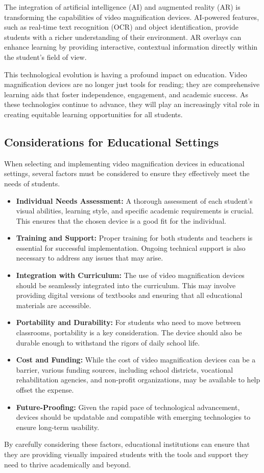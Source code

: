 The integration of artificial intelligence (AI) and augmented reality (AR) is transforming the capabilities of video magnification devices. AI-powered features, such as real-time text recognition (OCR) and object identification, provide students with a richer understanding of their environment. AR overlays can enhance learning by providing interactive, contextual information directly within the student's field of view.\supercite{aimodels2024, msseeingai, envision}

This technological evolution is having a profound impact on education. Video magnification devices are no longer just tools for reading; they are comprehensive learning aids that foster independence, engagement, and academic success. As these technologies continue to advance, they will play an increasingly vital role in creating equitable learning opportunities for all students.\supercite{StudentOutcomesResearch, Foley2017AssistiveTechnologyOutcomes}

\subsection{Considerations for Educational Settings}
When selecting and implementing video magnification devices in educational settings, several factors must be considered to ensure they effectively meet the needs of students.

\begin{itemize}
	\item \textbf{Individual Needs Assessment:} A thorough assessment of each student's visual abilities, learning style, and specific academic requirements is crucial. This ensures that the chosen device is a good fit for the individual.
	\item \textbf{Training and Support:} Proper training for both students and teachers is essential for successful implementation. Ongoing technical support is also necessary to address any issues that may arise.
	\item \textbf{Integration with Curriculum:} The use of video magnification devices should be seamlessly integrated into the curriculum. This may involve providing digital versions of textbooks and ensuring that all educational materials are accessible.
	\item \textbf{Portability and Durability:} For students who need to move between classrooms, portability is a key consideration. The device should also be durable enough to withstand the rigors of daily school life.
	\item \textbf{Cost and Funding:} While the cost of video magnification devices can be a barrier, various funding sources, including school districts, vocational rehabilitation agencies, and non-profit organizations, may be available to help offset the expense.
	\item \textbf{Future-Proofing:} Given the rapid pace of technological advancement, devices should be updatable and compatible with emerging technologies to ensure long-term usability.
\end{itemize}

By carefully considering these factors, educational institutions can ensure that they are providing visually impaired students with the tools and support they need to thrive academically and beyond.
